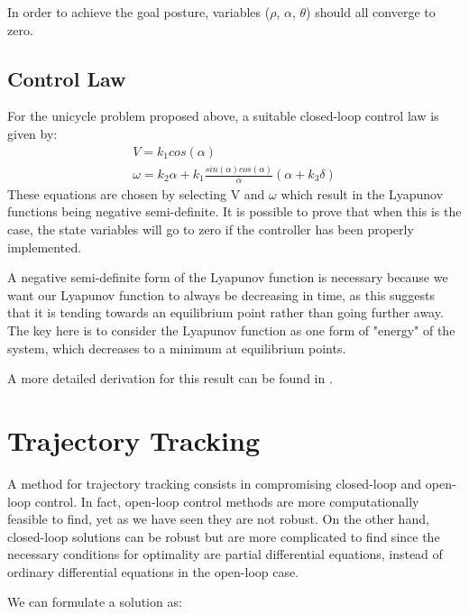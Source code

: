 \documentclass[twoside]{article}
\begin{document}
In order to achieve the goal posture, variables ($\rho$, $\alpha$, $\theta$) should all converge to zero.

\pagebreak
\subsection{Control Law}

For the unicycle problem proposed above, a suitable closed-loop control law is given by:
\begin{equation}
\begin{split}
V=k_1 cos(\alpha)
\\
\omega=k_2 \alpha + k_1 \frac{sin(\alpha)cos(\alpha)}{\alpha}(\alpha + k_3 \delta)
\end{split}
\end{equation}
These equations are chosen by selecting V and $\omega$ which result in the Lyapunov functions being negative semi-definite. It is possible to prove that when this is the case, the state variables will go to zero if the controller has been properly implemented.

A negative semi-definite form of the Lyapunov function is necessary because we want our Lyapunov function to always be decreasing in time, as this suggests that it is tending towards an equilibrium point rather than going further away. The key here is to consider the Lyapunov function as one form of "energy" of the system, which decreases to a minimum at equilibrium points.

A more detailed derivation for this result can be found in \cite{lyupanov}.


\section{Trajectory Tracking}
A method for trajectory tracking consists in compromising closed-loop and open-loop control. In fact, open-loop control methods are more computationally feasible to find, yet as we have seen they are not robust. On the other hand, closed-loop solutions can be robust but are more complicated to find since the necessary conditions for optimality are partial differential equations, instead of ordinary differential equations in the open-loop case.

We can formulate a solution as:
\end{document}
